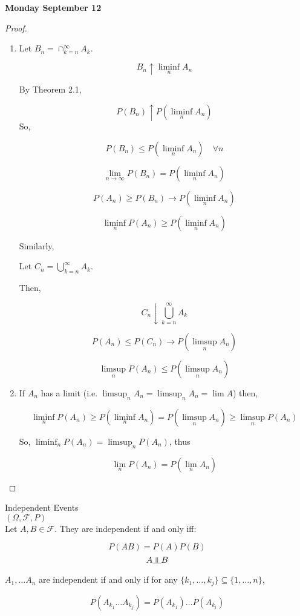 \documentclass[11pt,fleqn]{book} %
\newcommand{\indep}{\rotatebox[origin=c]{90}{$\models$}}
\begin{document}
\textbf{Monday September 12}

\begin{proof}
	\begin{enumerate}[label = (\roman*)]
		\item Let $B_n = \cap^\infty_{k=n} A_k$. 

			$$B_n \uparrow \liminf_{n } A_n $$

			By Theorem 2.1,  

			$$P(B_n) \uparrow P(\liminf_{n } A_n) $$
			So, 

			$$P(B_n) \leq P(\liminf_{n } A_n) \quad \forall n $$

			$$\lim_{n \rightarrow \infty} P(B_n)  = P(\liminf_{n} A_n)$$

			$$P(A_n) \geq P(B_n) \rightarrow P(\liminf_n A_n) $$

			$$\liminf_n P(A_n) \geq P(\liminf_{n} A_n)$$

			Similarly, 

			Let $C_n = \bigcup^\infty_{k=n} A_k$. 

			Then, 

			$$ C_n \downarrow \bigcup^\infty_{k=n} A_k$$

			$$P(A_n) \leq P(C_n) \rightarrow P(\limsup_{n } A_n) $$

			$$ \limsup_{n }P( A_n) \leq  P(\limsup_{n } A_n)$$

			\item If $A_n$ has a limit (i.e. $\limsup_n A_n = \limsup_n A_n = \lim A$) then,

			$$\liminf_n P(A_n) \geq P(\liminf_n A_n) = P(\limsup_n A_n) \geq \limsup_n P(A_n) $$

			So, $\liminf_n P(A_n) = \limsup_n P(A_n)$, thus

			$$\lim_n P(A_n) = P(\lim_n A_n) $$

	\end{enumerate}
\end{proof}


Independent Events\\

$(\Omega, \mathcal{F}, P)$\\

Let $A, B \in \mathcal{F}$. They are independent if and only iff: 

$$P(AB) = P(A)P(B) $$
$$A \indep B  $$

$A_1, \dots A_n$ are independent if and only if for any $\{k_1, \dots, k_j \} \subseteq \{1, \dots, n\}$, 

$$P(A_{k_1} \dots A_{k_j}) = P(A_{k_1}) \dots P(A_{k_i}) $$
\end{document}
